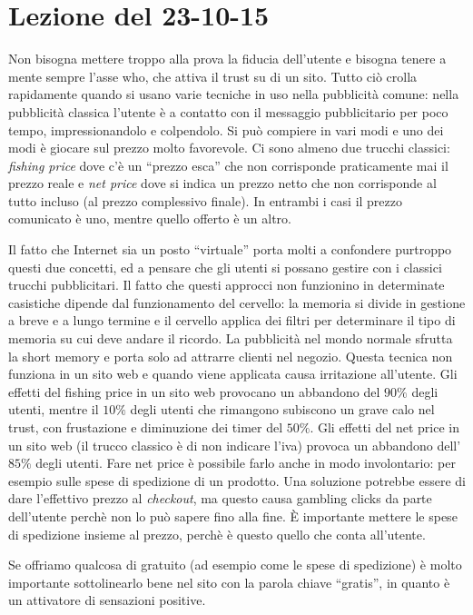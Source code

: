 \section{Lezione del 23-10-15}

Non bisogna mettere troppo alla prova la fiducia dell'utente e bisogna tenere a mente sempre l'asse who, che attiva il trust su di un sito. Tutto ci\`o crolla rapidamente quando si usano varie tecniche in uso nella pubblicit\`a comune: nella pubblicit\`a classica l'utente \`e a contatto con il messaggio pubblicitario per poco tempo, impressionandolo e colpendolo. Si pu\`o compiere in vari modi e uno dei modi \`e giocare sul prezzo molto favorevole. Ci sono almeno due trucchi classici: \textit{fishing price} dove c'\`e un ``prezzo esca'' che non corrisponde praticamente mai il prezzo reale e \textit{net price} dove si indica un prezzo netto che non corrisponde al tutto incluso (al prezzo complessivo finale). In entrambi i casi il prezzo comunicato \`e uno, mentre quello offerto \`e un altro.

Il fatto che Internet sia un posto ``virtuale'' porta molti a confondere purtroppo questi due concetti, ed a pensare che gli utenti si possano gestire con i classici trucchi pubblicitari. Il fatto che questi approcci non funzionino in determinate casistiche dipende dal funzionamento del cervello: la memoria si divide in gestione a breve e a lungo termine e il cervello applica dei filtri per determinare il tipo di memoria su cui deve andare il ricordo. La pubblicit\`a nel mondo normale sfrutta la short memory e porta solo ad attrarre clienti nel negozio. Questa tecnica non funziona in un sito web e quando viene applicata causa irritazione all'utente.
Gli effetti del fishing price in un sito web provocano un abbandono del $90\%$ degli utenti, mentre il $10\%$ degli utenti che rimangono subiscono un grave calo nel trust, con frustazione e diminuzione dei timer del $50\%$.
Gli effetti del net price in un sito web (il trucco classico \`e di non indicare l'iva) provoca un abbandono dell'$85\%$ degli utenti. Fare net price \`e possibile farlo anche in modo involontario: per esempio sulle spese di spedizione di un prodotto. Una soluzione potrebbe essere di dare l'effettivo prezzo al \textit{checkout}, ma questo causa gambling clicks da parte dell'utente perch\`e non lo pu\`o sapere fino alla fine. \`E importante mettere le spese di spedizione insieme al prezzo, perch\`e \`e questo quello che conta all'utente.

Se offriamo qualcosa di gratuito (ad esempio come le spese di spedizione) \`e molto importante sottolinearlo bene nel sito con la parola chiave ``gratis'', in quanto \`e un attivatore di sensazioni positive.

